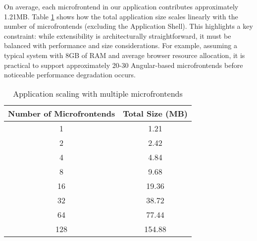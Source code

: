 On average, each microfrontend in our application contributes approximately 1.21MB. Table \ref{table:app-scaling} shows how the total application size scales linearly with the number of microfrontends (excluding the Application Shell). This highlights a key constraint: while extensibility is architecturally straightforward, it must be balanced with performance and size considerations. For example, assuming a typical system with 8GB of RAM and average browser resource allocation, it is practical to support approximately 20-30 Angular-based microfrontends before noticeable performance degradation occurs.
\begin{table}[h]
    \centering
    \begin{tabular}{|c|c|}
        \hline
        \textbf{Number of Microfrontends} & \textbf{Total Size (MB)} \\
        \hline
        1 & 1.21 \\
        \hline
        2 & 2.42 \\
        \hline
        4 & 4.84 \\
        \hline
        8 & 9.68 \\
        \hline
        16 & 19.36 \\
        \hline
        32 & 38.72 \\
        \hline
        64 & 77.44 \\
        \hline
        128 & 154.88 \\
        \hline
    \end{tabular}
    \caption{Application scaling with multiple microfrontends}
    \label{table:app-scaling}
\end{table}
